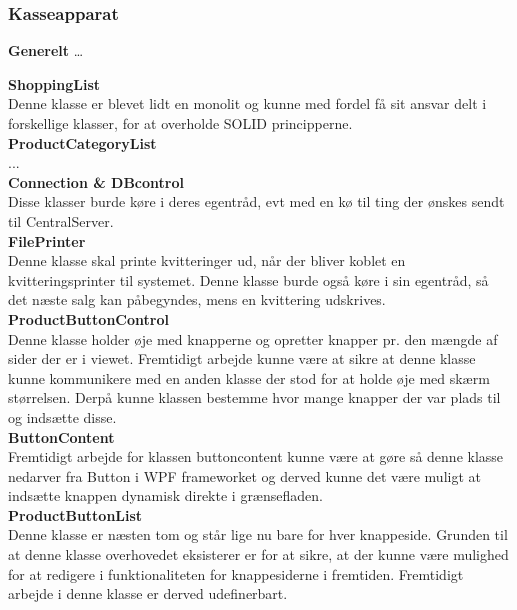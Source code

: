 \subsubsection{Kasseapparat}

\textbf{Generelt} 
…

\textbf{ShoppingList} \\
Denne klasse er blevet lidt en monolit og kunne med fordel få sit ansvar delt i forskellige klasser, for at overholde SOLID principperne.\\ 


\textbf{ProductCategoryList} \\
... \\

\textbf{Connection \& DBcontrol} \\

Disse klasser burde køre i deres egentråd, evt med en kø til ting der ønskes sendt til CentralServer. \\

\textbf{FilePrinter} \\
Denne klasse skal printe kvitteringer ud, når der bliver koblet en kvitteringsprinter til systemet. Denne klasse burde også køre i sin egentråd, så det næste salg kan påbegyndes, mens en kvittering udskrives. \\

\textbf{ProductButtonControl} \\
Denne klasse holder øje med knapperne og opretter knapper pr. den mængde af sider der er i viewet. Fremtidigt arbejde kunne være at sikre at denne klasse kunne kommunikere med en anden klasse der stod for at holde øje med skærm størrelsen. Derpå kunne klassen bestemme hvor mange knapper der var plads til og indsætte disse. \\

\textbf{ButtonContent} \\
Fremtidigt arbejde for klassen buttoncontent kunne være at gøre så denne klasse nedarver fra Button i WPF frameworket og derved kunne det være muligt at indsætte knappen dynamisk direkte i grænsefladen. \\

\textbf{ProductButtonList}\\
Denne klasse er næsten tom og står lige nu bare for hver knappeside. Grunden til at denne klasse overhovedet eksisterer er for at sikre, at der kunne være mulighed for at redigere i funktionaliteten for knappesiderne i fremtiden. Fremtidigt arbejde i denne klasse er derved udefinerbart.\\

